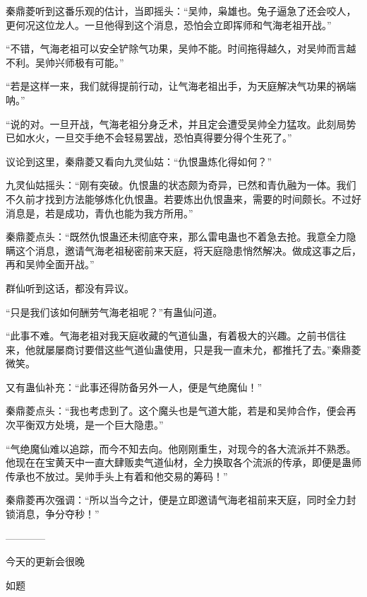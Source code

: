 \begin{this_body}
秦鼎菱听到这番乐观的估计，当即摇头：“吴帅，枭雄也。兔子逼急了还会咬人，更何况这位龙人。一旦他得到这个消息，恐怕会立即挥师和气海老祖开战。”

“不错，气海老祖可以安全铲除气功果，吴帅不能。时间拖得越久，对吴帅而言越不利。吴帅兴师极有可能。”

“若是这样一来，我们就得提前行动，让气海老祖出手，为天庭解决气功果的祸端呐。”

“说的对。一旦开战，气海老祖分身乏术，并且定会遭受吴帅全力猛攻。此刻局势已如水火，一旦交手绝不会轻易罢战，恐怕真得要分得个生死了。”

议论到这里，秦鼎菱又看向九灵仙姑：“仇恨蛊炼化得如何？”

九灵仙姑摇头：“刚有突破。仇恨蛊的状态颇为奇异，已然和青仇融为一体。我们不久前才找到方法能够炼化仇恨蛊。若要炼出仇恨蛊来，需要的时间颇长。不过好消息是，若是成功，青仇也能为我方所用。”

秦鼎菱点头：“既然仇恨蛊还未彻底夺来，那么雷电蛊也不着急去抢。我意全力隐瞒这个消息，邀请气海老祖秘密前来天庭，将天庭隐患悄然解决。做成这事之后，再和吴帅全面开战。”

群仙听到这话，都没有异议。

“只是我们该如何酬劳气海老祖呢？”有蛊仙问道。

“此事不难。气海老祖对我天庭收藏的气道仙蛊，有着极大的兴趣。之前书信往来，他就屡屡商讨要借这些气道仙蛊使用，只是我一直未允，都推托了去。”秦鼎菱微笑。

又有蛊仙补充：“此事还得防备另外一人，便是气绝魔仙！”

秦鼎菱点头：“我也考虑到了。这个魔头也是气道大能，若是和吴帅合作，便会再次平衡双方处境，是一个巨大隐患。”

“气绝魔仙难以追踪，而今不知去向。他刚刚重生，对现今的各大流派并不熟悉。他现在在宝黄天中一直大肆贩卖气道仙材，全力换取各个流派的传承，即便是蛊师传承也不放过。吴帅手头上有着和他交易的筹码！”

秦鼎菱再次强调：“所以当今之计，便是立即邀请气海老祖前来天庭，同时全力封锁消息，争分夺秒！”

------------

今天的更新会很晚

如题

\end{this_body}


